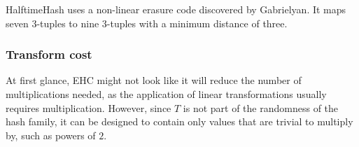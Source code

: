 \documentclass[runningheads]{llncs}
\newcommand{\ints}{\mathbb{Z}}
\begin{document}

HalftimeHash uses a non-linear erasure code discovered by Gab\-ri\-el\-yan. \cite{9-7-erasure-code}
It maps seven 3-tuples to nine 3-tuples with a minimum distance of three.




\subsubsection{Transform cost}

At first glance, EHC might not look like it will reduce the number of multiplications needed, as the application of linear transformations usually requires multiplication.
However, since $T$ is not part of the randomness of the hash family, it can be designed to contain only values that are trivial to multiply by, such as powers of $2$.
\end{document}
